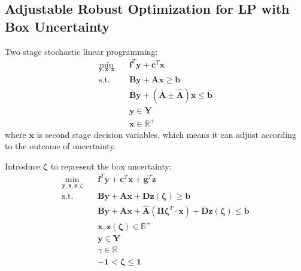 \documentclass[fleqn,10pt]{wlscirep}
\begin{document}
\subsection{Adjustable Robust Optimization for LP with Box Uncertainty}

Two stage stochastic linear programming:
\begin{align}
    \min_{\mathbf{y}, \mathbf{x}, \mathbf{z}} \quad& \mathbf{f}^{T} \mathbf{y} + \mathbf{c}^{T} \mathbf{x} \\
    \text{s.t.} \quad& \mathbf{B} \mathbf{y} + \mathbf{A} \mathbf{x} \geq \mathbf{b} \\ 
    & \overline{\mathbf{B}} \mathbf{y} + \left(\overline{\mathbf{A}} \pm \hat{\mathbf{A}} \right) \mathbf{x} \leq \overline{\mathbf{b}} \\
    & \mathbf{y} \in \mathbf{Y} \\
    & \mathbf{x} \in \mathbb{R}^{+}
\end{align}
where $\mathbf{x}$ is second stage decision variables, which means it can adjust according to the outcome of uncertainty.

Introduce $\boldsymbol{\zeta}$ to represent the box uncertainty:
\begin{align}
    \min_{\mathbf{y}, \mathbf{x}, \mathbf{z}, \zeta} \quad& \mathbf{f}^{T} \mathbf{y} + \mathbf{c}^{T} \mathbf{x} + \mathbf{g}^{T} \mathbf{z} \\
    \text{s.t.} \quad & \mathbf{B} \mathbf{y} + \mathbf{A} \mathbf{x} + \mathbf{D} \mathbf{z}(\boldsymbol{\zeta}) \geq \mathbf{b} \\
    & \overline{\mathbf{B}} \mathbf{y} + \overline{\mathbf{A}} \mathbf{x} + \hat{\mathbf{A}} \left(\mathbf{II} \boldsymbol{\zeta}^{T} \cdot \mathbf{x} \right) + \overline{\mathbf{D}} \mathbf{z}(\boldsymbol{\zeta} ) \leq \overline{\mathbf{b}} \\
    & \mathbf{x}, \mathbf{z}(\boldsymbol{\zeta} ) \in \mathbb{R}^{+} \\
    & \mathbf{y} \in \mathbf{Y} \\
    & \gamma \in \mathbb{R} \\
    & - \mathbf{1} < \boldsymbol{\zeta}  \leq \mathbf{1}
\end{align}
\end{document}
